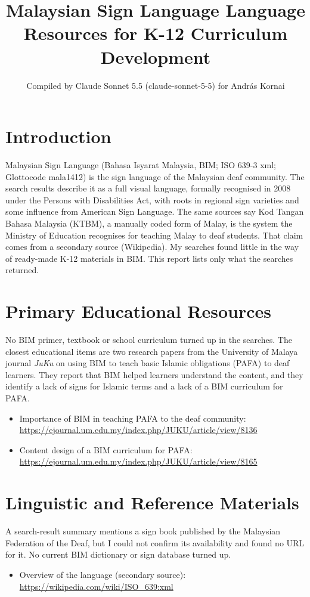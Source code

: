 \documentclass[12pt]{article}
\title{Malaysian Sign Language Language Resources for K-12 Curriculum Development}
\author{Compiled by Claude Sonnet 5.5 (claude-sonnet-5-5) for Andr\'as Kornai}
\date{}
\begin{document}
\maketitle

\section{Introduction}
Malaysian Sign Language (Bahasa Isyarat Malaysia, BIM; ISO 639-3 xml; Glottocode mala1412) is the sign language of the Malaysian deaf community. The search results describe it as a full visual language, formally recognised in 2008 under the Persons with Disabilities Act, with roots in regional sign varieties and some influence from American Sign Language. The same sources say Kod Tangan Bahasa Malaysia (KTBM), a manually coded form of Malay, is the system the Ministry of Education recognises for teaching Malay to deaf students. That claim comes from a secondary source (Wikipedia). My searches found little in the way of ready-made K-12 materials in BIM. This report lists only what the searches returned.

\section{Primary Educational Resources}
No BIM primer, textbook or school curriculum turned up in the searches. The closest educational items are two research papers from the University of Malaya journal \emph{JuKu} on using BIM to teach basic Islamic obligations (PAFA) to deaf learners. They report that BIM helped learners understand the content, and they identify a lack of signs for Islamic terms and a lack of a BIM curriculum for PAFA.
\begin{itemize}
\item Importance of BIM in teaching PAFA to the deaf community: \url{https://ejournal.um.edu.my/index.php/JUKU/article/view/8136}
\item Content design of a BIM curriculum for PAFA: \url{https://ejournal.um.edu.my/index.php/JUKU/article/view/8165}
\end{itemize}

\section{Linguistic and Reference Materials}
A search-result summary mentions a sign book published by the Malaysian Federation of the Deaf, but I could not confirm its availability and found no URL for it. No current BIM dictionary or sign database turned up.
\begin{itemize}
\item Overview of the language (secondary source): \url{https://wikipedia.com/wiki/ISO_639:xml}
\end{itemize}
\end{document}
